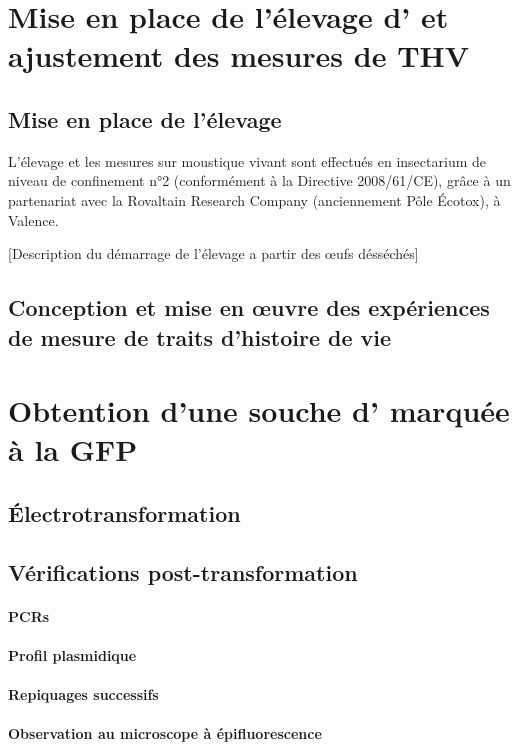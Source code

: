\section{Mise en place de l'élevage d' et ajustement des mesures de THV}

\subsection{Mise en place de l'élevage}

L'élevage et les mesures sur moustique vivant sont effectués en insectarium de niveau de confinement n°2 (conformément à la Directive 2008/61/CE), grâce à un partenariat avec la Rovaltain Research Company (anciennement Pôle Écotox), à Valence.

[Description du démarrage de l'élevage a partir des \oe{}ufs désséchés]

\subsection{Conception et mise en \oe{}uvre des expériences de mesure de traits d'histoire de vie}

\section{Obtention d'une souche d' marquée à la GFP}

\subsection{Électrotransformation}

\subsection{Vérifications post-transformation}

\paragraph{PCRs}
\paragraph{Profil plasmidique}
\paragraph{Repiquages successifs}
\paragraph{Observation au microscope à épifluorescence}

